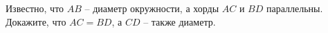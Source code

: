 \begin{ex}
	\begin{condition}
		Известно, что \( AB \) – диаметр окружности, а хорды \( AC  \) и \( BD  \) параллельны. Докажите, что \( AC = BD \), а \( CD  \) – также диаметр.
	\end{condition}
\end{ex}